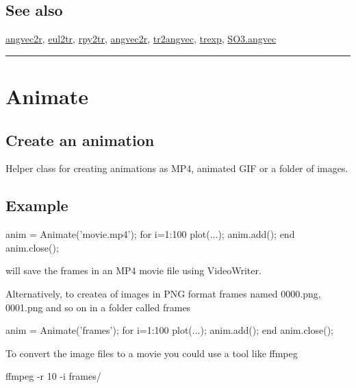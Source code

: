 \subsection*{See also}


\hyperlink{angvec2r}{\color{blue} angvec2r}, \hyperlink{eul2tr}{\color{blue} eul2tr}, \hyperlink{rpy2tr}{\color{blue} rpy2tr}, \hyperlink{angvec2r}{\color{blue} angvec2r}, \hyperlink{tr2angvec}{\color{blue} tr2angvec}, \hyperlink{trexp}{\color{blue} trexp}, \hyperlink{SO3.angvec}{\color{blue} SO3.angvec}

\vspace{1.5ex}\rule{\textwidth}{1mm}

\hypertarget{Animate}{\section*{Animate}}
\subsection*{Create an animation}


Helper class for creating animations as MP4, animated GIF or a folder of images.


\subsection*{Example}
\begin{Code}
   anim = Animate('movie.mp4');
    for i=1:100
        plot(...);
        anim.add();
    end
    anim.close();

\end{Code}


will save the frames in an MP4 movie file using VideoWriter.



Alternatively, to createa of images in PNG format frames named 0000.png,
0001.png and so on in a folder called \textquotesingle frames\textquotesingle 

\begin{Code}
    anim = Animate('frames');
    for i=1:100
        plot(...);
        anim.add();
    end
    anim.close();

\end{Code}


To convert the image files to a movie you could use a tool like ffmpeg

\begin{Code}
     ffmpeg -r 10 -i frames/%

\end{Code}

